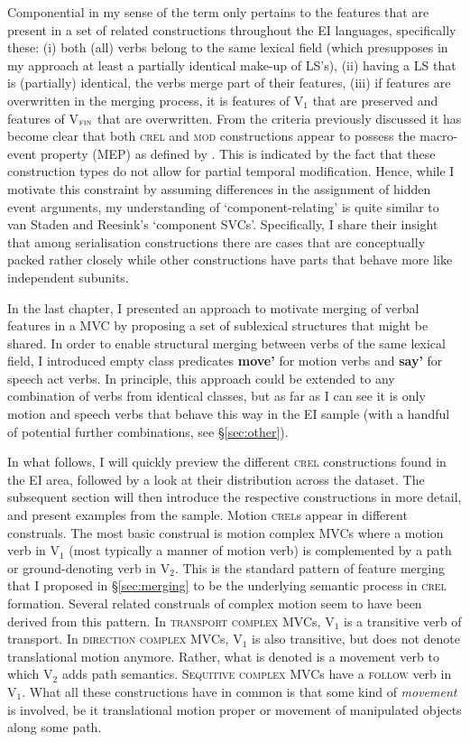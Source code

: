 Componential in my sense of the term only pertains to the features that are present in a set of related constructions throughout the EI languages, specifically these: (i) both (all) verbs belong to the same lexical field (which presupposes in my approach at least a partially identical make-up of LS's), (ii) having a LS that is (partially) identical, the verbs merge part of their features, (iii) if features are overwritten in the merging process, it is features of V$_{1}$ that are preserved and features of V$_{\textsc{fin}}$ that are overwritten. From the criteria previously discussed it has become clear that both \textsc{crel} and \textsc{mod} constructions appear to possess the macro-event property (MEP) as defined by \citet{bohnemeyer2007principles}. This is indicated by the fact that these construction types do not allow for partial temporal modification. Hence, while I motivate this constraint by assuming differences in the assignment of hidden event arguments, my understanding of `component-relating' is quite similar to van Staden and Reesink's `component SVCs'. Specifically, I share their insight that among serialisation constructions there are cases that are conceptually packed rather closely while other constructions have parts that behave more like independent subunits.

In the last chapter, I presented an approach to motivate merging of verbal features in a MVC by proposing a set of sublexical structures that might be shared. In order to enable structural merging between verbs of the same lexical field, I introduced empty class predicates \textbf{move'} for motion verbs and \textbf{say'} for speech act verbs. In principle, this approach could be extended to any combination of verbs from identical classes, but as far as I can see it is only motion and speech verbs that behave this way in the EI sample (with a handful of potential further combinations, see §\ref{sec:other}). 

In what follows, I will quickly preview the different \textsc{crel} constructions found in the EI area, followed by a look at their distribution across the dataset. The subsequent section will then introduce the respective constructions in more detail, and present examples from the sample. Motion \textsc{crel}s appear in different construals. The most basic construal is motion complex MVCs where a motion verb in V$_1$ (most typically a manner of motion verb) is complemented by a path or ground-denoting verb in V$_2$. This is the standard pattern of feature merging that I  proposed in §\ref{sec:merging} to be the underlying semantic process in \textsc{crel} formation. Several related construals of complex motion seem to have been derived from this pattern. In \textsc{transport complex} MVCs, V$_1$ is a transitive verb of transport. In \textsc{direction complex} MVCs, V$_1$ is also transitive, but does not denote translational motion anymore. Rather, what is denoted is a movement verb to which V$_2$ adds path semantics. \textsc{Sequitive complex} MVCs have a \textsc{follow} verb in V$_1$. What all these constructions have in common is that some kind of \emph{movement} is involved, be it translational motion proper or movement of manipulated objects along some path.

